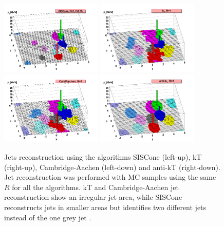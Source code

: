 \begin{figure}[ht]
  \begin{center}
    \includegraphics[width=0.43\textwidth]{figuras/Chapter3/herwig-parton-level-ev-siscone-R1-0-f0-75-ghosted4root.png}
    \includegraphics[width=0.43\textwidth]{figuras/Chapter3/herwig-parton-level-ev-kt-R1-0-ghosted4root.png}
    \includegraphics[width=0.43\textwidth]{figuras/Chapter3/herwig-parton-level-ev-cam-R1-0-ghosted4root.png}
    \includegraphics[width=0.43\textwidth]{figuras/Chapter3/herwig-parton-level-ev-antikt-R1-0-ghosted4root.png}
    \caption{Jets reconstruction using the algorithms SISCone (left-up), kT (right-up), Cambridge-Aachen 
    (left-down) and anti-kT (right-down). Jet reconstruction was performed with MC samples using the same $R$
    for all the algorithms. kT and Cambridge-Aachen jet reconstruction show an irregular jet area, while SISCone
    reconstructs jets in smaller areas but identifies two different jets instead of the one grey jet \cite{Atkin:2015msa}.}
    \label{fig:JetsAlgos}
  \end{center}
\end{figure}

